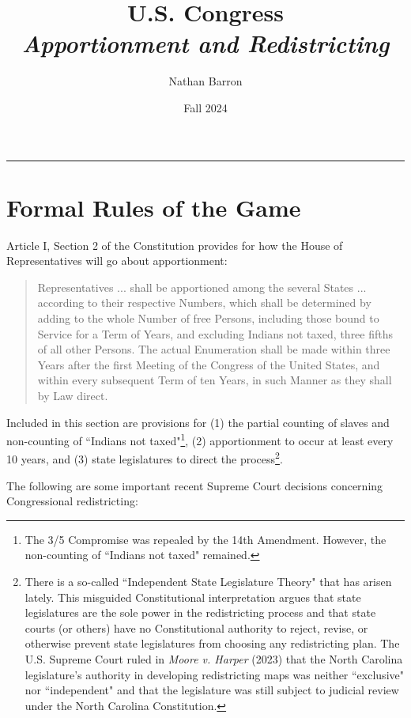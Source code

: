 \documentclass[10pt]{article}
\title{\textbf{U.S. Congress}\\\textit{Apportionment and Redistricting}}
\author{Nathan Barron}
\date{Fall 2024}
\begin{document}
	\maketitle
	\tableofcontents
	\vspace{.25in}
	\hrule
	\vspace{.25in}
	
	
	\section{Formal Rules of the Game}
	
	Article I, Section 2 of the Constitution provides for how the House of Representatives will go about apportionment: 
	
	\begin{quote}
		\footnotesize
		Representatives ... shall be apportioned among the several States ... according to their respective Numbers, which shall be determined by adding to the whole Number of free Persons, including those bound to Service for a Term of Years, and excluding Indians not taxed, three fifths of all other Persons. The actual Enumeration shall be made within three Years after the first Meeting of the Congress of the United States, and within every subsequent Term of ten Years, in such Manner as they shall by Law direct.
	\end{quote}
	
	Included in this section are provisions for (1) the partial counting of slaves and non-counting of ``Indians not taxed"\footnote{The 3/5 Compromise was repealed by the 14th Amendment. However, the non-counting of ``Indians not taxed" remained.}, (2) apportionment to occur at least every 10 years, and (3) state legislatures to direct the process\footnote{There is a so-called ``Independent State Legislature Theory" that has arisen lately. This misguided Constitutional interpretation argues that state legislatures are the sole power in the redistricting process and that state courts (or others) have no Constitutional authority to reject, revise, or otherwise prevent state legislatures from choosing any redistricting plan. The U.S. Supreme Court ruled in \textit{Moore v. Harper} (2023) that the North Carolina legislature's authority in developing redistricting maps was neither ``exclusive" nor ``independent" and that the legislature was still subject to judicial review under the North Carolina Constitution.}. 
	
	The following are some important recent Supreme Court decisions concerning Congressional redistricting: 
	
\end{document}
